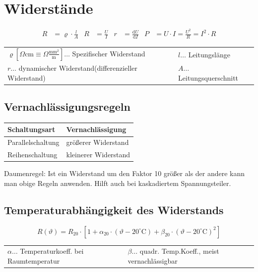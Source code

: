 \section{Widerstände}
	\begin{align*}
		R&=\varrho\cdot\frac{l}{A} &
		R&=\frac{U}{I} &
		r&=\frac{\mathrm{d}U}{\mathrm{d}I} &
		P&=U\cdot I=\frac{U^2}{R}=I^2\cdot R
	\end{align*}

	\begin{table}[h]
	\begin{tabular}{ll}
	$\varrho \left[\Omega\mathrm{cm}\equiv\Omega\frac{\mathrm{mm}^2}{\mathrm{m}}\right]\dots$ Spezifischer Widerstand & $l\dots$ Leitungslänge\\
	$r\dots$ dynamischer Widerstand(differenzieller Widerstand) & $A\dots$ Leitungsquerschnitt \\
	\end{tabular}
	\end{table}
		
	\subsection{Vernachlässigungsregeln}
		\begin{table}[here]
		\begin{tabular}{ll}
		Schaltungsart & Vernachlässigung\\
		\toprule
		Parallelschaltung & größerer Widerstand\\
		\midrule
		Reihenschaltung & kleinerer Widerstand\\
		\end{tabular}
		\end{table}

		Daumenregel: Ist ein Widerstand um den Faktor 10 größer als der andere kann man obige Regeln anwenden.
		Hilft auch bei kaskadiertem Spannungsteiler.

	\subsection{Temperaturabhängigkeit des Widerstands}
		\[
			R(\vartheta)=R_{20}\cdot\left[1+\alpha_{20}\cdot(\vartheta-20^{\circ}\mathrm{C})
			+\beta_{20}\cdot(\vartheta-20^{\circ}\mathrm{C})^2\right]
		\]

		\begin{table}[h]
		\begin{tabular}{ll}
		$\alpha\dots$ Temperaturkoeff. bei Raumtemperatur & $\beta\dots$ quadr. Temp.Koeff., meist vernachlässigbar\\
		\end{tabular}
		\end{table}

